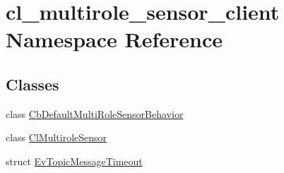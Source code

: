 \hypertarget{namespacecl__multirole__sensor__client}{}\section{cl\+\_\+multirole\+\_\+sensor\+\_\+client Namespace Reference}
\label{namespacecl__multirole__sensor__client}
\subsection*{Classes}
\begin{DoxyCompactItemize}
\item 
class \hyperlink{classcl__multirole__sensor__client_1_1CbDefaultMultiRoleSensorBehavior}{Cb\+Default\+Multi\+Role\+Sensor\+Behavior}
\item 
class \hyperlink{classcl__multirole__sensor__client_1_1ClMultiroleSensor}{Cl\+Multirole\+Sensor}
\item 
struct \hyperlink{structcl__multirole__sensor__client_1_1EvTopicMessageTimeout}{Ev\+Topic\+Message\+Timeout}
\end{DoxyCompactItemize}
